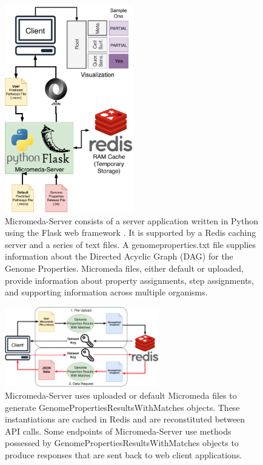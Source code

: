 \begin{figure}[!ht]
  \centering
	\includegraphics[width=0.50\textwidth]{media/Micromeda-Server.pdf}
	 \caption{Micromeda-Server consists of a server application written in Python using the Flask web framework \cite{grinberg2018flask}. It is supported by a Redis caching server and a series of text files. A genomeproperties.txt file supplies information about the Directed Acyclic Graph (DAG) for the Genome Properties. Micromeda files, either default or uploaded, provide information about property assignments, step assignments, and supporting information across multiple organisms.}
	 \label{fig:micromeda-server}
\end{figure}

\begin{figure}[!ht]
  \centering
	\includegraphics[width=0.60\textwidth]{media/Micromeda-Server-Workflow.pdf}
	 \caption{Micromeda-Server uses uploaded or default Micromeda files to generate GenomePropertiesResultsWithMatches objects. These instantiations are cached in Redis and are reconstituted between API calls. Some endpoints of Micromeda-Server use methods possessed by GenomePropertiesResultsWithMatches objects to produce responses that are sent back to web client applications.}
	 \label{fig:micromeda-server-workflow}
\end{figure}

